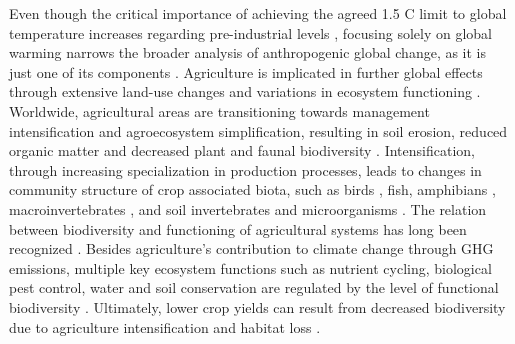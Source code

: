 Even though the critical importance of achieving the agreed 1.5 \degree C limit to global temperature increases regarding pre-industrial levels \citep{agreement2015paris}, focusing solely on global warming narrows the broader analysis of anthropogenic global change, as it is just one of its components \citep{vitousek1994}. Agriculture is implicated in further global effects through extensive land-use changes and variations in ecosystem functioning \citep{tomich2011}. Worldwide, agricultural areas are transitioning towards management intensification and agroecosystem simplification, resulting in soil erosion, reduced organic matter and decreased plant and faunal biodiversity \citep{zimmerer2010}. Intensification, through increasing specialization in production processes, leads to changes in community structure of crop associated biota, such as birds \citep{donald2006further, jeliazkov2016}, fish, amphibians \citep{gopel2020}, macroinvertebrates \citep{perez2023enhanced}, and soil invertebrates and microorganisms \citep{matson1997}. The relation between biodiversity and functioning of agricultural systems has long been recognized \citep{Swift1996-qx}. Besides agriculture's contribution to climate change through GHG emissions, multiple key ecosystem functions such as nutrient cycling, biological pest control, water and soil conservation are regulated by the level of functional biodiversity \citep{nicholls1998}. Ultimately, lower crop yields can result from decreased biodiversity due to agriculture intensification and habitat loss \citep{richards2001}.\\   %


